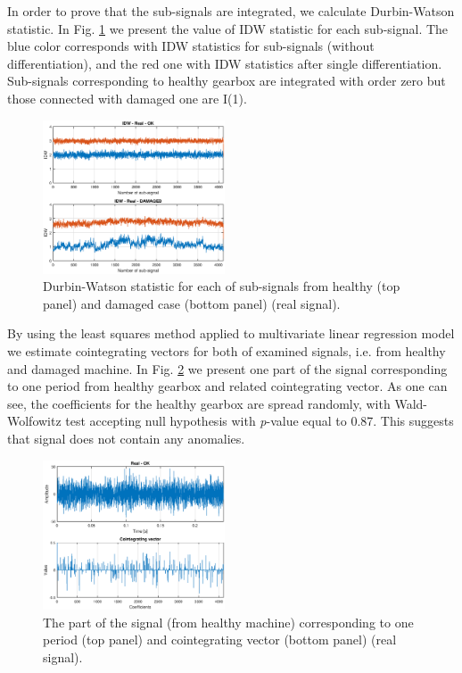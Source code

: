 \documentclass[preprint]{elsarticle}
\begin{document}
In order to prove that the sub-signals are integrated, we calculate Durbin-Watson statistic. In Fig. \ref{fig:real_IDW} we present the value of IDW statistic for each sub-signal. The blue color corresponds with IDW statistics for sub-signals (without differentiation), and the red one with IDW statistics after single differentiation. Sub-signals corresponding to healthy gearbox are integrated with order zero but those connected with damaged one are I(1).

\begin{figure}[ht!]
\centering
\includegraphics[width=0.48\textwidth]{wykresy/real_IDW.eps}
\caption{Durbin-Watson statistic for each of sub-signals from healthy (top panel) and damaged case (bottom panel) (real signal).}
\label{fig:real_IDW}
\end{figure}

By using the least squares method applied to multivariate linear regression model we estimate cointegrating vectors for both of examined  signals, i.e. from healthy and damaged machine. In Fig. \ref{fig:real_vector_ok} we present one part of the signal corresponding to one period from healthy gearbox and related cointegrating vector. As one can see, the coefficients for the healthy gearbox are spread randomly, with Wald-Wolfowitz test accepting null hypothesis with \emph{p}-value equal to 0.87. This suggests that signal does not contain any anomalies.

\begin{figure}[ht!]
\centering
\includegraphics[width=0.48\textwidth]{wykresy/real_vector_ok.eps}
\caption{The part of the signal (from healthy machine) corresponding to one  period (top panel) and cointegrating vector (bottom panel) (real signal).}
\label{fig:real_vector_ok}
\end{figure}
\end{document}
